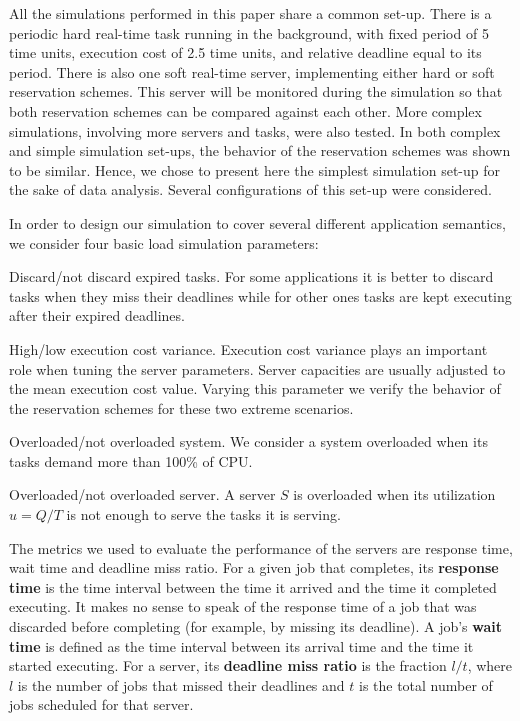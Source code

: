 \documentclass[times, 10pt,twocolumn]{article}
\begin{document}
All the simulations performed in this paper share a common
set-up. There is a periodic hard real-time task running in the
background, with fixed period of 5 time units, execution cost of 2.5
time units, and relative deadline equal to its period.  There is also
one soft real-time server, implementing either hard or soft
reservation schemes.  This server will be monitored during the
simulation so that both reservation schemes can be compared against
each other. More complex simulations, involving more servers and
tasks, were also tested. In both complex and simple simulation
set-ups, the behavior of the reservation schemes was shown to be
similar. Hence, we chose to present here the simplest simulation
set-up for the sake of data analysis.  Several configurations of this
set-up were considered.

\label{sec:configurations}

In order to design our simulation to cover several different
application semantics, we consider four basic load simulation
parameters:
\begin{description}
\item Discard/not discard expired tasks. For some applications it is
  better to discard tasks when they miss their deadlines while for
  other ones tasks are kept executing after their expired deadlines.
\item High/low execution cost variance. Execution cost variance plays
  an important role when tuning the server parameters. Server
  capacities are usually adjusted to the mean execution cost
  value. Varying this parameter we verify the behavior of the
  reservation schemes for these two extreme scenarios.
\item Overloaded/not overloaded system. We consider a system
  overloaded when its tasks demand more than 100\% of CPU.
\item Overloaded/not overloaded server. A server $S$ is overloaded
  when its utilization $u = Q/T$ is not enough to serve the
  tasks it is serving.
\end{description}

The metrics we used to evaluate the performance of the servers are
response time, wait time and deadline miss ratio. For a given job that
completes, its \textbf{response time} is the time interval between the
time it arrived and the time it completed executing. It makes no sense
to speak of the response time of a job that was discarded before
completing (for example, by missing its deadline). A job's
\textbf{wait time} is defined as the time interval between its arrival
time and the time it started executing. For a server, its
\textbf{deadline miss ratio} is the fraction $l/t$, where $l$ is the
number of jobs that missed their deadlines and $t$ is the total number
of jobs scheduled for that server.
\end{document}
